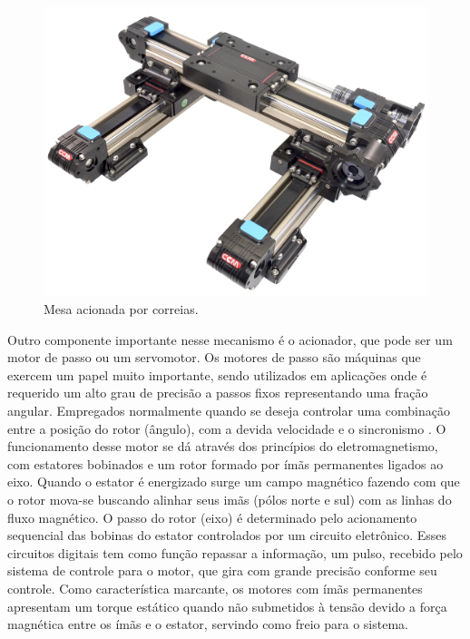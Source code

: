 \begin{figure}[H]
\centering
\caption{Mesa acionada por correias.}\label{fig:mcorreia}
\includegraphics[scale = 0.065]{figuras/mcorreia}
\end{figure}
    
Outro componente importante nesse mecanismo é o acionador, que pode ser um motor de passo ou um servomotor. 
Os motores de passo são máquinas que exercem um papel muito importante, sendo utilizados em 
aplicações onde é requerido um alto grau de precisão a passos fixos representando uma fração angular. 
Empregados normalmente quando se deseja controlar uma combinação entre a posição do rotor (ângulo), 
com a devida velocidade e o sincronismo \cite{silva2018maquinas}. O funcionamento desse motor se dá através dos princípios do eletromagnetismo, com estatores bobinados e um rotor 
formado por ímãs permanentes ligados ao eixo. Quando o estator é energizado surge um campo magnético fazendo 
com que o rotor mova-se buscando alinhar seus imãs (pólos norte e sul) com as linhas do fluxo magnético. 
O passo do rotor (eixo) é determinado pelo acionamento sequencial das bobinas do estator controlados por 
um circuito eletrônico. Esses circuitos digitais tem como função repassar a informação, um pulso, recebido 
pelo sistema de controle para o motor, que gira com grande precisão conforme seu controle. Como característica 
marcante, os motores com ímãs permanentes apresentam um torque estático quando não submetidos à tensão devido 
a força magnética entre os ímãs e o estator, servindo como freio para o sistema.
 
